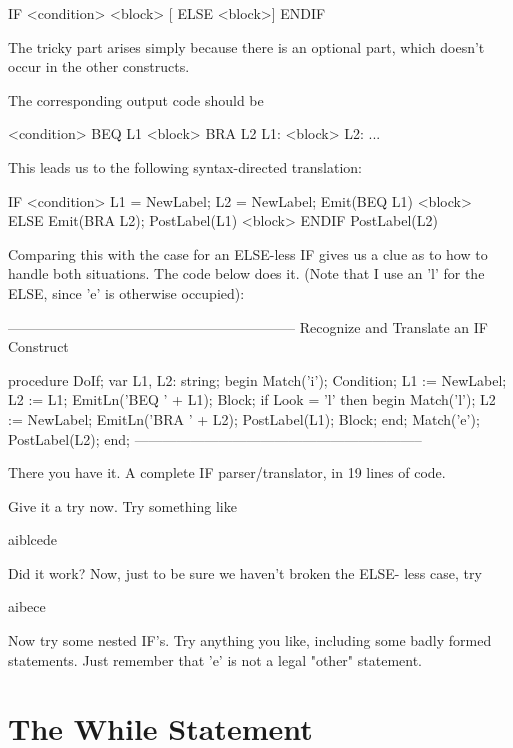 \documentclass[float=false, crop=false]{standalone}
\begin{document}
     IF <condition> <block> [ ELSE <block>] ENDIF


The tricky part arises simply because there is an optional part, which doesn't
occur in the other constructs.

The corresponding output code should be


          <condition>
          BEQ L1
          <block>
          BRA L2
     L1:  <block>
     L2:  ...


This leads us to the following syntax-directed translation:


     IF
     <condition>    { L1 = NewLabel;
                      L2 = NewLabel;
                      Emit(BEQ L1) }
     <block>
     ELSE           { Emit(BRA L2);
                      PostLabel(L1) }
     <block>
     ENDIF          { PostLabel(L2) }


Comparing this with the case for an ELSE-less IF gives us a clue as to how to
handle both situations. The code below does it. (Note that I use an 'l' for the
ELSE, since 'e' is otherwise occupied):

\begin{code}
{--------------------------------------------------------------}
{ Recognize and Translate an IF Construct }

procedure DoIf;
var L1, L2: string;
begin
   Match('i');
   Condition;
   L1 := NewLabel;
   L2 := L1;
   EmitLn('BEQ ' + L1);
   Block;
   if Look = 'l' then begin
      Match('l');
      L2 := NewLabel;
      EmitLn('BRA ' + L2);
      PostLabel(L1);
      Block;
   end;
   Match('e');
   PostLabel(L2);
end;
{--------------------------------------------------------------}
\end{code}

There you have it. A complete IF parser/translator, in 19 lines of code.

Give it a try now.  Try something like

   aiblcede

Did it work? Now, just to be sure we haven't broken the ELSE- less case, try

   aibece

Now try some nested IF's. Try anything you like, including some badly formed
statements. Just remember that 'e' is not a legal "other" statement.


\section{The While Statement}
\end{document}
